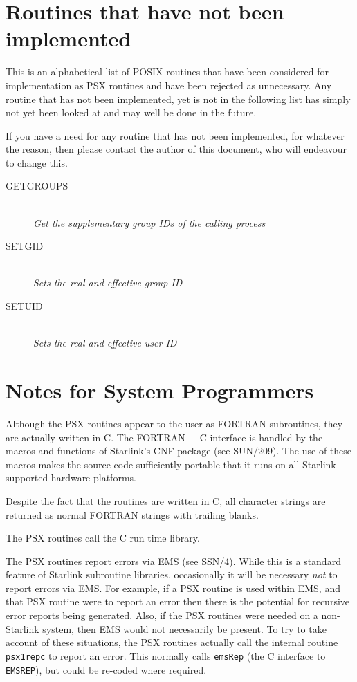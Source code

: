 \documentclass[twoside,11pt]{article}
\newcommand{\latex}[1]{#1}
\newcommand{\xref}[3]{#1}
\newcommand{\xlabel}[1]{}
\renewcommand{\_}{\texttt{\symbol{95}}}
\newcommand{\listline}{\hspace{1pt}\\}
\newcommand{\listline}{}
\newcommand{\notimproutine}[4]{\item [#1 #3] \listline
\textit{#4} }
\begin{document}
\newpage
\section{\xlabel{routines_that_have_not_been_implemented}Routines that have not been implemented}
\label{not-implelmented}

This is an alphabetical list of POSIX routines that have been considered for
implementation as PSX routines and have been rejected as unnecessary. Any
routine that has not been implemented, yet is not in the following list has
simply not yet been looked at and may well be done in the future.

If you have a need for any routine that has not been implemented, for whatever
the reason, then please contact the author of this document, who will endeavour
to change this.
\begin{description}
\notimproutine{GETGROUPS}{}{}
            {Get the supplementary group IDs of the calling process}
\notimproutine{SETGID}{}{}
            {Sets the real and effective group ID}
\notimproutine{SETUID}{}{}
            {Sets the real and effective user ID}
\end{description}

\section{\xlabel{notes_for_system_programmers}Notes for System Programmers}

Although the PSX routines appear to the user as FORTRAN subroutines,
they are actually written in C. The FORTRAN~--~C interface is handled
by the macros and functions of Starlink's
\xref{CNF}{sun209}{abstract}
package\latex{ (see SUN/209)}.
The use of these macros makes the source code sufficiently portable that it
runs on all Starlink supported hardware platforms.

Despite the fact that the routines are written in C, all character strings are
returned as normal FORTRAN strings with trailing blanks.

The PSX routines call the C run time library.

The PSX routines report errors via
\xref{EMS}{ssn4}{abstract}\latex{ (see SSN/4)}.
While this is a standard
feature of Starlink subroutine libraries, occasionally it will be
necessary \emph{not} to report errors via EMS. For example, if a PSX routine
is used within EMS, and that PSX routine were to report an error then
there is the potential for recursive error reports being generated.
Also, if the PSX routines were needed on a non-Starlink system, then
EMS would not necessarily be present. To try to take account of these
situations, the PSX routines actually call the internal routine
\texttt{psx1\_rep\_c} to report an error. This normally calls
\texttt{emsRep} (the C interface to
\xref{\texttt{EMS\_REP}}{ssn4}{EMS_REP}),
but could be re-coded where required.

\end{document}
